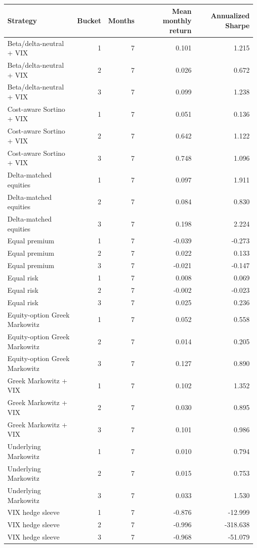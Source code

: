 \begin{tabular}{lrrrr}
\toprule
Strategy & Bucket & Months & Mean monthly return & Annualized Sharpe \\
\midrule
Beta/delta-neutral + VIX & 1 & 7 & 0.101 & 1.215 \\
Beta/delta-neutral + VIX & 2 & 7 & 0.026 & 0.672 \\
Beta/delta-neutral + VIX & 3 & 7 & 0.099 & 1.238 \\
Cost-aware Sortino + VIX & 1 & 7 & 0.051 & 0.136 \\
Cost-aware Sortino + VIX & 2 & 7 & 0.642 & 1.122 \\
Cost-aware Sortino + VIX & 3 & 7 & 0.748 & 1.096 \\
Delta-matched equities & 1 & 7 & 0.097 & 1.911 \\
Delta-matched equities & 2 & 7 & 0.084 & 0.830 \\
Delta-matched equities & 3 & 7 & 0.198 & 2.224 \\
Equal premium & 1 & 7 & -0.039 & -0.273 \\
Equal premium & 2 & 7 & 0.022 & 0.133 \\
Equal premium & 3 & 7 & -0.021 & -0.147 \\
Equal risk & 1 & 7 & 0.008 & 0.069 \\
Equal risk & 2 & 7 & -0.002 & -0.023 \\
Equal risk & 3 & 7 & 0.025 & 0.236 \\
Equity-option Greek Markowitz & 1 & 7 & 0.052 & 0.558 \\
Equity-option Greek Markowitz & 2 & 7 & 0.014 & 0.205 \\
Equity-option Greek Markowitz & 3 & 7 & 0.127 & 0.890 \\
Greek Markowitz + VIX & 1 & 7 & 0.102 & 1.352 \\
Greek Markowitz + VIX & 2 & 7 & 0.030 & 0.895 \\
Greek Markowitz + VIX & 3 & 7 & 0.101 & 0.986 \\
Underlying Markowitz & 1 & 7 & 0.010 & 0.794 \\
Underlying Markowitz & 2 & 7 & 0.015 & 0.753 \\
Underlying Markowitz & 3 & 7 & 0.033 & 1.530 \\
VIX hedge sleeve & 1 & 7 & -0.876 & -12.999 \\
VIX hedge sleeve & 2 & 7 & -0.996 & -318.638 \\
VIX hedge sleeve & 3 & 7 & -0.968 & -51.079 \\
\bottomrule
\end{tabular}
